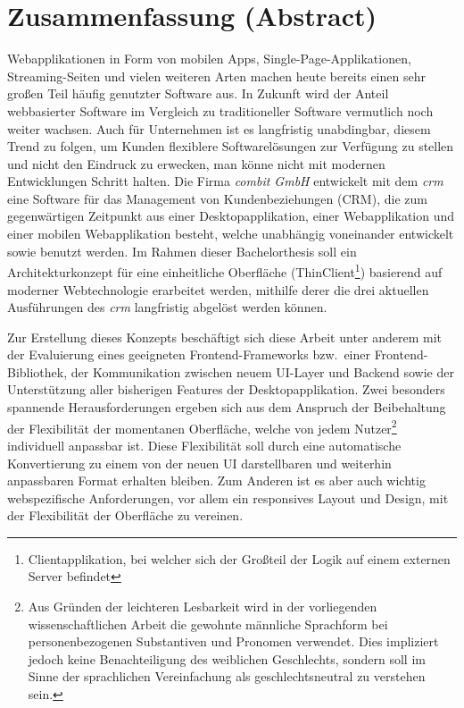 \chapter{Zusammenfassung (Abstract)}

Webapplikationen in Form von mobilen Apps, Single-Page-Applikationen, Streaming-Seiten und vielen weiteren Arten machen heute bereits einen sehr großen Teil häufig genutzter Software aus. %
In Zukunft wird der Anteil webbasierter Software im Vergleich zu traditioneller Software vermutlich noch weiter wachsen.
Auch für Unternehmen ist es langfristig unabdingbar, diesem Trend zu folgen, um Kunden flexiblere Softwarelösungen zur Verfügung zu stellen und nicht den Eindruck zu erwecken, man könne nicht mit modernen Entwicklungen Schritt halten.
Die Firma \textit{combit GmbH} entwickelt mit dem \textit{\gls{crm}} eine Software für das Management von Kundenbeziehungen (\gls{CRM}), die zum gegenwärtigen Zeitpunkt aus einer Desktopapplikation, einer Webapplikation und einer mobilen Webapplikation besteht, welche unabhängig voneinander entwickelt sowie benutzt werden.
Im Rahmen dieser Bachelorthesis soll ein Architekturkonzept für eine einheitliche Oberfläche (ThinClient\footnote{Clientapplikation, bei welcher sich der Großteil der Logik auf einem externen Server befindet}) basierend auf moderner Webtechnologie erarbeitet werden, mithilfe derer die drei aktuellen Ausführungen des \textit{\gls{crm}} langfristig abgelöst werden können.

Zur Erstellung dieses Konzepts beschäftigt sich diese Arbeit unter anderem mit der Evaluierung eines geeigneten Frontend-Frameworks bzw.\ einer Frontend-Bibliothek, der Kommunikation zwischen neuem UI-Layer und Backend sowie der Unterstützung aller bisherigen Features der Desktopapplikation.
Zwei besonders spannende Herausforderungen ergeben sich aus dem Anspruch der Beibehaltung der Flexibilität der momentanen Oberfläche, welche von jedem Nutzer\footnote{Aus Gründen der leichteren Lesbarkeit wird in der vorliegenden wissenschaftlichen Arbeit die gewohnte männliche Sprachform bei personenbezogenen Substantiven und Pronomen verwendet. Dies impliziert jedoch keine Benachteiligung des weiblichen Geschlechts, sondern soll im Sinne der sprachlichen Vereinfachung als geschlechtsneutral zu verstehen sein.} individuell anpassbar ist. Diese Flexibilität soll durch eine automatische Konvertierung zu einem von der neuen UI darstellbaren und weiterhin anpassbaren Format erhalten bleiben. Zum Anderen ist es aber auch wichtig webspezifische Anforderungen, vor allem ein responsives Layout und Design, mit der Flexibilität der Oberfläche zu vereinen.
